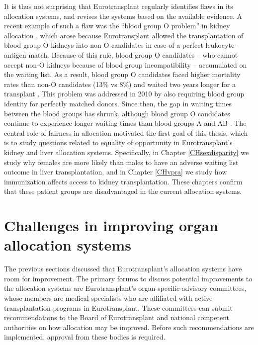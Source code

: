\documentclass[11pt,twoside,]{book}
\begin{document}
It is thus not surprising that Eurotransplant regularly identifies flaws
in its allocation systems, and revises the systems based on the available
evidence. A recent example of such a flaw was the ``blood group O problem'' in kidney
allocation \citep{glander2010}, which arose because Eurotransplant allowed the
transplantation of blood group O kidneys into non-O candidates in case of a perfect
leukocyte-antigen match. Because of this rule, blood group O candidates -- who cannot accept non-O
kidneys because of blood group incompatibility -- accumulated on the waiting list.
As a result, blood group O candidates faced higher mortality rates than non-O
candidates (13\% vs 8\%) and waited two years longer for a transplant \citep{glander2010}.
This problem was addressed in 2010 by also requiring blood
group identity for perfectly matched donors.
Since then, the gap in waiting times between the blood groups has
shrunk, although blood group O candidates continue to experience longer waiting times
than blood groups A and AB \citep{etStatsLibrary2194P}.
\newpage
The central role of fairness in allocation motivated the first goal of this thesis, which is to
study questions related to equality of opportunity in Eurotransplant's kidney
and liver allocation systems. Specifically,
in Chapter \ref{CHsexdisparity} we study why females are more likely than males
to have an adverse waiting list outcome in liver transplantation, and in Chapter
\ref{CHvpra} we study how immunization affects access to kidney
transplantation. These chapters confirm
that these patient groups are disadvantaged in the current allocation systems.

\section{Challenges in improving organ allocation systems}\label{challenges-in-improving-organ-allocation-systems}

The previous sections discussed that Eurotransplant's allocation systems have
room for improvement. The primary
forums to discuss potential improvements to the allocation systems are
Eurotransplant's organ-specific advisory committees, whose members are
medical specialists who are affiliated with active transplantation programs in Eurotransplant.
These committees can submit recommendations to the
Board of Eurotransplant and national competent authorities on how allocation
may be improved. Before such recommendations are implemented, approval from
these bodies is required.
\end{document}

